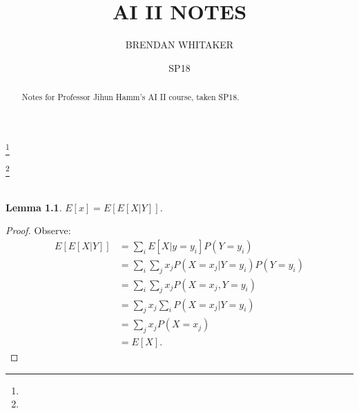 \documentclass{amsbook}
\theoremstyle{plain}
\numberwithin{section}{chapter}
\numberwithin{equation}{chapter}
\newtheorem{lem}[theorem]{Lemma}
\theoremstyle{definition}
\theoremstyle{remark}
\newcommand{\bee}{\begin{equation}\begin{aligned}}
\newcommand{\eee}{\end{aligned}\end{equation}}
\begin{document}
\frontmatter

\title{AI II NOTES}


\author{BRENDAN WHITAKER}
\address{}
\curraddr{}
\email{}
\thanks{}

\author{}
\address{}
\curraddr{}
\email{}
\thanks{}


\keywords{}

\date{SP18}

\begin{abstract}
Notes for Professor Jihun Hamm's AI II course, taken SP18. 
\end{abstract}

\maketitle


\setcounter{page}{4}

\tableofcontents

%



\mainmatter
%
\setcounter{part}{0}
\part{}
\setcounter{chapter}{0}
\chapter{}
\begin{lem}
$E[x] = E[E[X|Y]]$. 
\end{lem}

\begin{proof}
Observe: 
\bee
E[E[X|Y]] &= \sum_i E[X|y = y_i] P(Y = y_i)\\
&= \sum_i \sum_j x_jP(X = x_j|Y = y_i)P(Y = y_i)\\
&= \sum_i \sum_j x_jP(X = x_j,Y = y_i)\\
&= \sum_jx_j \sum_i P(X = x_j|Y = y_i)\\
&= \sum_jx_j P(X = x_j)\\
&= E[X].
\eee

\end{proof}
\end{document}
